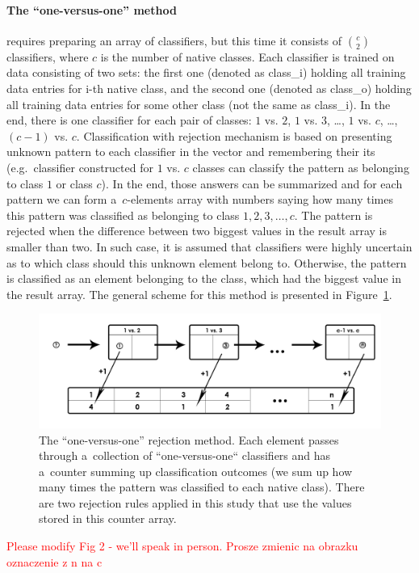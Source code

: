 \documentclass{llncs}
\begin{document}
\paragraph{The ``one-versus-one'' method} requires preparing an array of classifiers, but this time it consists of ${c}\choose{2}$ classifiers, where $c$ is the number of native classes. Each classifier is trained on data consisting of two sets: the first one (denoted as class\_i) holding all training data entries for i-th native class, and the second one (denoted as class\_o) holding all training data entries for some other class (not the same as class\_i). In the end, there is one classifier for each pair of classes: $1$ vs. $2$, $1$ vs. $3$, \dots, $1$ vs. $c$, \dots, $(c-1)$ vs. $c$. Classification with rejection mechanism is based on presenting unknown pattern to each classifier in the vector and remembering their its (e.g.~classifier constructed for $1$ vs. $c$ classes can classify the pattern as belonging to class $1$ or class $c$). In the end, those answers can be summarized and for each pattern we can form a~$c$-elements array with numbers saying how many times this pattern was classified as belonging to class $1, 2, 3, \ldots, c$. The pattern is rejected when the difference between two biggest values in the result array is smaller than two. In such case, it is assumed that classifiers were highly uncertain as to which class should this unknown element belong to. Otherwise, the pattern is classified as an element belonging to the class, which had the biggest value in the result array. The general scheme for this method is presented in Figure~\ref{fig:rejection_version2}. 

\begin{figure}[!t]
	\centering
	\includegraphics[width=1\textwidth]{_Figures/ClassificationWithRejection2.jpg}
	\caption{ The ``one-versus-one'' rejection method. Each element passes through a~collection of ``one-versus-one`` classifiers and has a~counter summing up classification outcomes (we sum up how many times the pattern was classified to each native class). There are two rejection rules applied in this study that use the values stored in this counter array. }
	\label{fig:rejection_version2}\vspace{-3pt}
\end{figure}
\textcolor{red}{Please modify Fig 2 - we'll speak in person. Prosze zmienic na obrazku oznaczenie z n na c}
\end{document}
